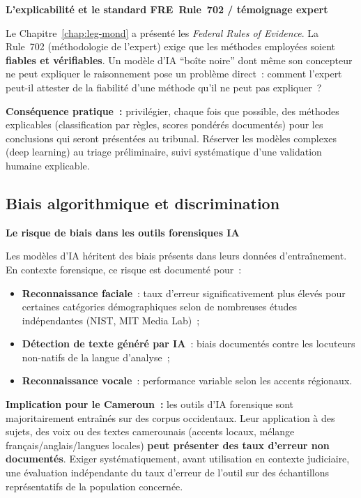 \begin{boxjuris}
\textbf{L'explicabilité et le standard FRE~Rule~702 / témoignage expert}

Le Chapitre~\ref{chap:leg-mond} a présenté les \textit{Federal Rules
of Evidence}. La Rule~702 (méthodologie de l'expert) exige que les
méthodes employées soient \textbf{fiables et vérifiables}. Un modèle
d'IA ``boîte noire'' dont même son concepteur ne peut expliquer le
raisonnement pose un problème direct~: comment l'expert peut-il
attester de la fiabilité d'une méthode qu'il ne peut pas expliquer~?

\textbf{Conséquence pratique~:} privilégier, chaque fois que possible,
des méthodes explicables (classification par règles, scores pondérés
documentés) pour les conclusions qui seront présentées au tribunal.
Réserver les modèles complexes (deep learning) au triage préliminaire,
suivi systématique d'une validation humaine explicable.
\end{boxjuris}

\subsection{Biais algorithmique et discrimination}

\begin{boxalert}
\textbf{Le risque de biais dans les outils forensiques IA}

Les modèles d'IA héritent des biais présents dans leurs données
d'entraînement. En contexte forensique, ce risque est documenté
pour~:
\begin{itemize}
    \item \textbf{Reconnaissance faciale}~: taux d'erreur
          significativement plus élevés pour certaines catégories
          démographiques selon de nombreuses études indépendantes
          (NIST, MIT Media Lab)~;
    \item \textbf{Détection de texte généré par IA}~: biais
          documentés contre les locuteurs non-natifs de la
          langue d'analyse~;
    \item \textbf{Reconnaissance vocale}~: performance variable
          selon les accents régionaux.
\end{itemize}
\textbf{Implication pour le Cameroun~:} les outils d'IA forensique
sont majoritairement entraînés sur des corpus occidentaux.
Leur application à des sujets, des voix ou des textes camerounais
(accents locaux, mélange français/anglais/langues locales)
\textbf{peut présenter des taux d'erreur non documentés}.
Exiger systématiquement, avant utilisation en contexte judiciaire,
une évaluation indépendante du taux d'erreur de l'outil sur des
échantillons représentatifs de la population concernée.
\end{boxalert}

